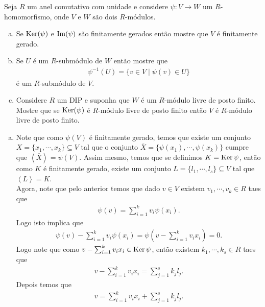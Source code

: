 \begin{homeworkProblem}[6]
  Seja $R$ um anel comutativo com unidade e considere $\psi : V \to W$ um $R$-homomorfismo, onde $V$ e $W$ são dois $R$-módulos.
  \begin{enumerate}[(a)]
    \item Se $\operatorname{Ker}(\psi)$ e $\operatorname{Im}(\psi)$ são finitamente gerados então mostre que $V$ é finitamente gerado.    
    \item Se $U$ é um $R$-submódulo de $W$ então mostre que
    \begin{align*}
      \psi^{-1}(U) = \{v \in V \mid \psi(v) \in U\}
    \end{align*}
    é um $R$-submódulo de $V$.
    \item Considere $R$ um DIP e suponha que $W$ é um $R$-módulo livre de posto finito. Mostre que se $\operatorname{Ker}(\psi)$ é $R$-módulo livre de posto finito então $V$ é $R$-módulo livre de posto finito.
  \end{enumerate}
  \begin{solution}
  \begin{enumerate}[(a)]
    \item Note que como $\psi(V)$ é finitamente gerado, temos que existe um conjunto $X=\{x_1,\cdots,x_k\}\subseteq V$ tal que o conjunto $\overline{X}=\{\psi(x_1),\cdots,\psi(x_k)\}$ cumpre que $\left\langle \overline{X} \right\rangle=\psi(V)$. Assim mesmo, temos que se definimos $K=\operatorname{Ker}\psi$, então como $K$ é finitamente gerado, existe um conjunto $L=\{l_1,\cdots,l_s\}\subseteq V$ tal que $\left\langle L\right\rangle=K$.\\
      Agora, note que pelo anterior temos que dado $v\in V$ existem $v_1,\cdots,v_k\in R$ taes que 
      \begin{align*}
        \psi(v)=\sum_{i=1}^{k}v_i\psi(x_i).
      \end{align*}
      Logo isto implica que
      \begin{align*}
        \psi(v)-\sum_{i=1}^{k}v_i\psi(x_i)=\psi\left( v-\sum_{i=1}^{k}v_ix_i \right)=0.
      \end{align*}
      Logo note que como $v-\sum_{i=1}^{k}v_ix_i\in\operatorname{Ker}\psi$, então existem $k_1,\cdots,k_s\in R$ taes que
      \begin{align*}
        v-\sum_{i=1}^{k}v_ix_i=\sum_{j=1}^{s}k_jl_j.
      \end{align*}
      Depois temos que
      \begin{align*}
        v=\sum_{i=1}^{k}v_ix_i+\sum_{j=1}^{s}k_jl_j.
      \end{align*}

\end{enumerate}
\end{solution}
\end{homeworkProblem}
